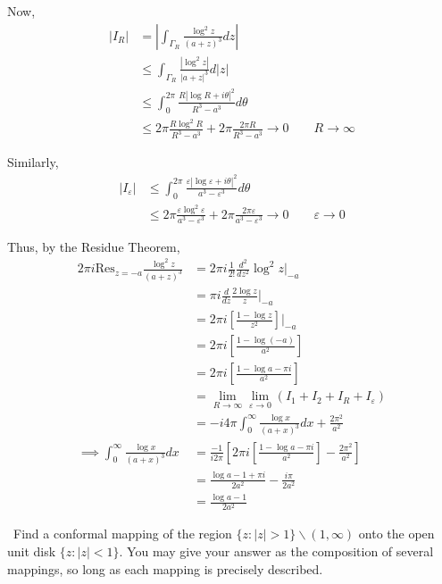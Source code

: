 \documentclass[12pt]{Homework}
\newcommand{\res}{\text{Res}}
\begin{document}
\begin{solution}
Now, \begin{align*}
    |I_R|&=\left|\int_{\Gamma_R}\frac{\log^2z}{(a+z)^3}dz\right|\\
    &\le\int_{\Gamma_R}\frac{|\log^2 z|}{|a+z|^3}d|z|\\
    &\le\int_0^{2\pi}\frac{R|\log R+i\theta|^2}{R^3-a^3}d\theta\\
    &\le 2\pi\frac{R\log^2R}{R^3-a^3}+2\pi\frac{2\pi R}{R^3-a^3}\to0\qquad R\to\infty
\end{align*}

Similarly, \begin{align*}
    |I_\varepsilon|&\le\int_0^{2\pi}\frac{\varepsilon|\log \varepsilon+i\theta|^2}{a^3-\varepsilon^3}d\theta\\
    &\le 2\pi\frac{\varepsilon\log^2\varepsilon}{a^3-\varepsilon^3}+2\pi\frac{2\pi \varepsilon}{a^3-\varepsilon^3}\to0\qquad \varepsilon\to0
\end{align*} 

Thus, by the Residue Theorem, \begin{align*}
    2\pi i\res_{z=-a}\frac{\log^2 z}{(a+z)^3}&=2\pi i \frac{1}{2!}\frac{d^2}{dz^2}\log^2z\Big|_{-a}\\
    &=\pi i\frac{d}{dz}\frac{2\log z}{z}\Big|_{-a}\\
    &=2\pi i\left[\frac{1-\log z}{z^2}\right]\Big|_{-a}\\
    &=2\pi i\left[\frac{1-\log(-a)}{a^2}\right]\\
    &=2\pi i\left[\frac{1-\log a-\pi i}{a^2}\right]\\
    &=\lim_{R\to\infty}\lim_{\varepsilon\to 0}(I_1+I_2+I_R+I_\varepsilon)\\
    &=-i4\pi\int_0^\infty\frac{\log x}{(a+x)^3}dx+\frac{2\pi^2}{a^2}\\
    \implies \int_0^\infty\frac{\log x}{(a+x)^3}dx&=\frac{-1}{i2\pi}\left[2\pi i\left[\frac{1-\log a-\pi i}{a^2}\right]-\frac{2\pi^2}{a^2}\right]\\
    &=\frac{\log a-1+\pi i}{2a^2}-\frac{i\pi}{2a^2}\\
    &=\frac{\log a-1}{2a^2}
\end{align*}
\end{solution}
\newpage



\begin{problem} $\,$
Find a conformal mapping of the region $\{z:|z|>1\}\backslash(1,\infty)$ onto the open unit disk $\{z:|z|<1\}.$ You may give your answer as the composition of several mappings, so long as each mapping is precisely described.
\end{problem}
\end{document}
